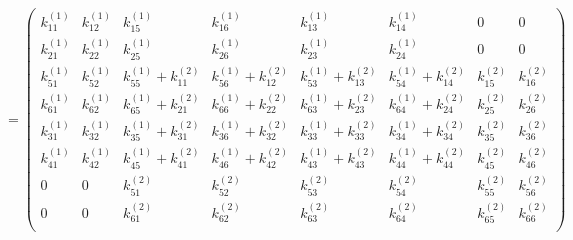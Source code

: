 \begin{equation}
= \begin{pmatrix}
k_{11}^{\left(1\right)} & k_{12}^{\left(1\right)} &  k_{15}^{\left(1\right)} &  k_{16}^{\left(1\right)} & k_{13}^{\left(1\right)}  & k_{14}^{\left(1\right)} & 0 & 0   \\[0.3em]
k_{21}^{\left(1\right)} & k_{22}^{\left(1\right)} &  k_{25}^{\left(1\right)} &  k_{26}^{\left(1\right)} & k_{23}^{\left(1\right)}  & k_{24}^{\left(1\right)} & 0 & 0   \\[0.3em]
k_{51}^{\left(1\right)} & k_{52}^{\left(1\right)}  &k_{55}^{\left(1\right)}+k_{11}^{\left(2\right)} & k_{56}^{\left(1\right)}+k_{12}^{\left(2\right)} &  k_{53}^{\left(1\right)}+k_{13}^{\left(2\right)} &  k_{54}^{\left(1\right)}+k_{14}^{\left(2\right)} & k_{15}^{\left(2\right)}  & k_{16}^{\left(2\right)}   \\[0.3em]
k_{61}^{\left(1\right)} & k_{62}^{\left(1\right)} & k_{65}^{\left(1\right)}+k_{21}^{\left(2\right)} & k_{66}^{\left(1\right)}+k_{22}^{\left(2\right)} & k_{63}^{\left(1\right)}+ k_{23}^{\left(2\right)} &  k_{64}^{\left(1\right)}+k_{24}^{\left(2\right)} & k_{25}^{\left(2\right)}  & k_{26}^{\left(2\right)}   \\[0.3em]
k_{31}^{\left(1\right)} & k_{32}^{\left(1\right)} &k_{35}^{\left(1\right)}+ k_{31}^{\left(2\right)} & k_{36}^{\left(1\right)} + k_{32}^{\left(2\right)} & k_{33}^{\left(1\right)}+ k_{33}^{\left(2\right)} &  k_{34}^{\left(1\right)}+k_{34}^{\left(2\right)} & k_{35}^{\left(2\right)}  & k_{36}^{\left(2\right)}    \\[0.3em]
k_{41}^{\left(1\right)} & k_{42}^{\left(1\right)}&k_{45}^{\left(1\right)}+ k_{41}^{\left(2\right)} & k_{46}^{\left(1\right)}+k_{42}^{\left(2\right)} & k_{43}^{\left(1\right)}+ k_{43}^{\left(2\right)} &  k_{44}^{\left(1\right)}+k_{44}^{\left(2\right)} & k_{45}^{\left(2\right)}  & k_{46}^{\left(2\right)}    \\[0.3em]
0 & 0 & k_{51}^{\left(2\right)} & k_{52}^{\left(2\right)} &  k_{53}^{\left(2\right)} &  k_{54}^{\left(2\right)} & k_{55}^{\left(2\right)}  & k_{56}^{\left(2\right)}   \\[0.3em]
0 & 0 & k_{61}^{\left(2\right)} & k_{62}^{\left(2\right)} &  k_{63}^{\left(2\right)} &  k_{64}^{\left(2\right)} & k_{65}^{\left(2\right)}  & k_{66}^{\left(2\right)}    \\[0.3em]
\end{pmatrix}
\end{equation}

